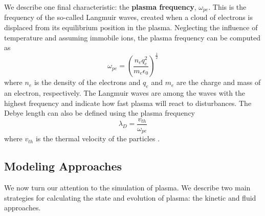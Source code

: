 We describe one final characteristic: the \textbf{plasma frequency}, $\omega_{pe}$. This is the frequency of the so-called Langmuir waves, created when a cloud of electrons is displaced from its equilibrium position in the plasma. Neglecting the influence of temperature and assuming immobile ions, the plasma frequency can be computed as
 \begin{equation}
     \omega_{pe} = \left(\frac{n_e q_e^2}{m_e\epsilon_0}\right)^{\frac{1}{2}}
 \end{equation}
 where $n_e$ is the density of the electrons and $q_e$ and $m_e$ are the charge and mass of an electron, respectively. The Langmuir waves are among the waves with the highest frequency and indicate how fast plasma will react to disturbances. The Debye length can also be defined using the plasma frequency
 \begin{equation}
     \lambda_D = \frac{v_{th}}{\omega_{pe}}
 \end{equation}
 where $v_{th}$ is the thermal velocity of the particles 
\cite{chen_introduction_1984, chen_lecture_2003}.

\subsection{Modeling Approaches}
\label{subsec: plasma approaches}
We now turn our attention to the simulation of plasma. We describe two main strategies for calculating the state and evolution of plasma: the kinetic and fluid approaches. 
